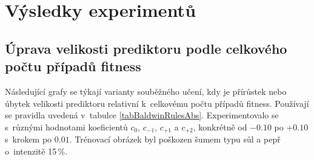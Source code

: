 \chapter{Výsledky experimentů}
\label{apxResults}

\section{Úprava velikosti prediktoru podle celkového počtu případů fitness}
\label{apxExpAbs}

Následující grafy se týkají varianty souběžného učení, kdy je přírůstek nebo úbytek velikosti prediktoru relativní k~celkovému počtu případů fitness. Používají se pravidla uvedená v~tabulce \ref{tabBaldwinRulesAbs}. Experimentovalo se s~různými hodnotami koeficientů $c_0$, $c_{-1}$, $c_{+1}$ a $c_{+2}$, konkrétně od $-0.10$ po $+0.10$ s~krokem po $0.01$. Trénovací obrázek byl poškozen šumem typu sůl a pepř o~intenzitě 15\,\%.

